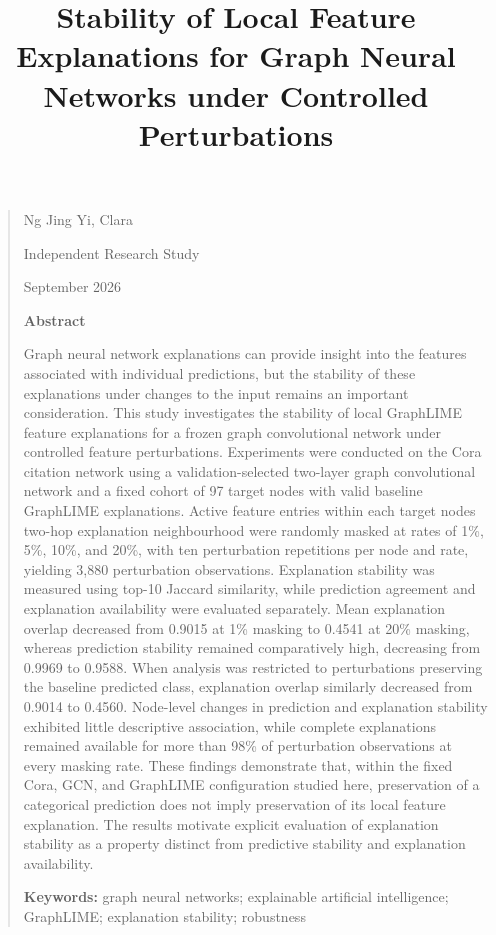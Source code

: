 \documentclass[a4paper]{article}
\title{Stability of Local Feature Explanations for Graph Neural Networks
under Controlled Perturbations}
\author{}
\date{}
\begin{document}
\maketitle

\begin{quote}
Ng Jing Yi, Clara

Independent Research Study

September 2026

\textbf{Abstract}

Graph neural network explanations can provide insight into the features
associated with individual predictions, but the stability of these
explanations under changes to the input remains an important
consideration. This study investigates the stability of local GraphLIME
feature explanations for a frozen graph convolutional network under
controlled feature perturbations. Experiments were conducted on the Cora
citation network using a validation-selected two-layer graph
convolutional network and a fixed cohort of 97 target nodes with valid
baseline GraphLIME explanations. Active feature entries within each
target node\textquotesingle s two-hop explanation neighbourhood were
randomly masked at rates of 1\%, 5\%, 10\%, and 20\%, with ten
perturbation repetitions per node and rate, yielding 3,880 perturbation
observations. Explanation stability was measured using top-10 Jaccard
similarity, while prediction agreement and explanation availability were
evaluated separately. Mean explanation overlap decreased from 0.9015 at
1\% masking to 0.4541 at 20\% masking, whereas prediction stability
remained comparatively high, decreasing from 0.9969 to 0.9588. When
analysis was restricted to perturbations preserving the baseline
predicted class, explanation overlap similarly decreased from 0.9014 to
0.4560. Node-level changes in prediction and explanation stability
exhibited little descriptive association, while complete explanations
remained available for more than 98\% of perturbation observations at
every masking rate. These findings demonstrate that, within the fixed
Cora, GCN, and GraphLIME configuration studied here, preservation of a
categorical prediction does not imply preservation of its local feature
explanation. The results motivate explicit evaluation of explanation
stability as a property distinct from predictive stability and
explanation availability.

\textbf{Keywords:} graph neural networks; explainable artificial
intelligence; GraphLIME; explanation stability; robustness
\end{quote}
\end{document}
